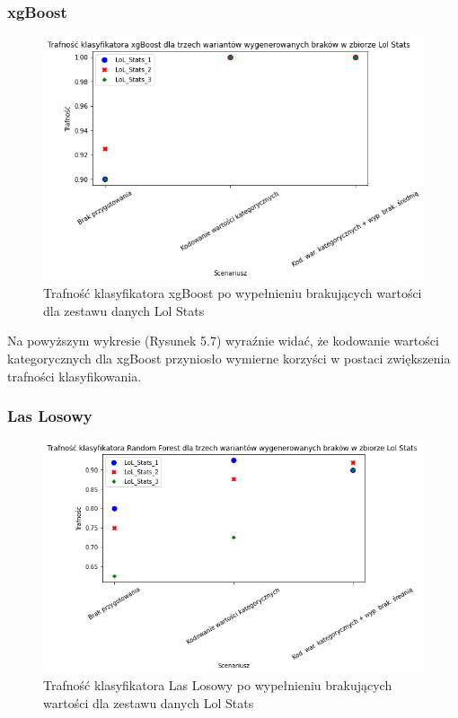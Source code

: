 \documentclass{book}
\begin{document}
\subsubsection{xgBoost}
    \begin{figure}[H]
    \centerline{\includegraphics[scale=0.5]{Lol_stats_xgb_Kodowanie}}
    \centering
    \caption{Trafność klasyfikatora xgBoost po wypełnieniu brakujących wartości dla zestawu danych Lol Stats}
    \end{figure}

    Na powyższym wykresie (Rysunek 5.7) wyraźnie widać, że kodowanie wartości kategorycznych dla xgBoost przyniosło wymierne 
    korzyści w postaci zwiększenia trafności klasyfikowania.

\subsubsection{Las Losowy}
    \begin{figure}[H]
    \centerline{\includegraphics[scale=0.5]{Lol_stats_rfc_Kodowanie}}
    \centering
    \caption{Trafność klasyfikatora Las Losowy po wypełnieniu brakujących wartości dla zestawu danych Lol Stats}
    \end{figure}
\end{document}
